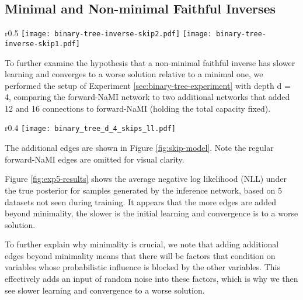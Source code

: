 \subsection{Minimal and Non-minimal Faithful Inverses}\label{sec:skip-experiment}
\begin{wrapfigure}{r}{0.5\textwidth}
	\vspace{-8pt}
	\centering
	{\texttt{[image: binary-tree-inverse-skip2.pdf]}}\hspace{0.5cm}
	{\texttt{[image: binary-tree-inverse-skip1.pdf]}}
	\caption{Additional edges over forward-NaMI. \label{fig:skip-model}}\vspace{-10pt}
\end{wrapfigure}
To further examine the hypothesis that a non-minimal
faithful inverse has slower learning and converges to a worse
solution relative to a minimal one, we performed the setup of Experiment \ref{sec:binary-tree-experiment} with depth d = 4,  comparing the forward-NaMI
network to two additional networks that added 12 and 16 connections to forward-NaMI (holding the total capacity fixed).
\begin{wrapfigure}{r}{0.4\textwidth}
	\vspace{-15pt}
  \centering
  {\texttt{[image: binary\_tree\_d\_4\_skips\_ll.pdf]}}
  \vspace*{-3ex}
		\caption{Average NLL of inference network samples under analytical posterior. \label{fig:exp5-results}}
\end{wrapfigure}

\vspace{-2pt}
The additional edges are shown  in Figure \ref{fig:skip-model}.
Note the
regular forward-NaMI edges are omitted for visual clarity.

Figure \ref{fig:exp5-results} shows the average negative log likelihood (NLL) under the true posterior for samples generated by the inference network, based on 5 datasets not seen during training. It appears that the more edges are added beyond minimality, the slower is the initial learning and convergence is to a worse solution.

To further explain why minimality is crucial, we note that adding additional edges beyond minimality means that there will be factors that condition on variables whose probabilistic influence is blocked by the other variables. This effectively adds an input of random noise into these factors, which is why we then see slower learning and convergence to a worse solution.

